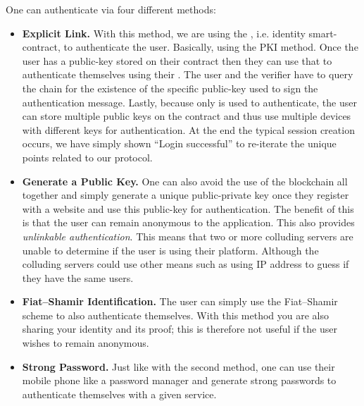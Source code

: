 One can authenticate via four different methods:
\begin{itemize}
    \item \textbf{Explicit Link.} With this method, we are using the \deeid, i.e. identity smart-contract, to authenticate the user. Basically, using the PKI method. Once the user has a public-key stored on their \deeid contract then they can use that to authenticate themselves using their \deeid. The user and the verifier have to query the chain for the existence of the specific public-key used to sign the authentication message. Lastly, because only \deeid is used to authenticate, the user can store multiple public keys on the contract and thus use multiple devices with different keys for authentication. At the end the typical session creation occurs, we have simply shown ``Login successful'' to re-iterate the unique points related to our protocol.
    
    \item \textbf{Generate a Public Key.} One can also avoid the use of the blockchain all together and simply generate a unique public-private key once they register with a website and use this public-key for authentication. The benefit of this is that the user can remain anonymous to the application. This also provides \textit{unlinkable authentication}. This means that two or more colluding servers are unable to determine if the user is using their platform. Although the colluding servers could use other means such as using IP address to guess if they have the same users.
    
    \item \textbf{Fiat--Shamir Identification.} The user can simply use the Fiat--Shamir scheme to also authenticate themselves. With this method you are also sharing your identity and its proof; this is therefore not useful if the user wishes to remain anonymous.
    
    \item \textbf{Strong Password.} Just like with the second method, one can use their mobile phone like a password manager and generate strong passwords to authenticate themselves with a given service.
\end{itemize}

